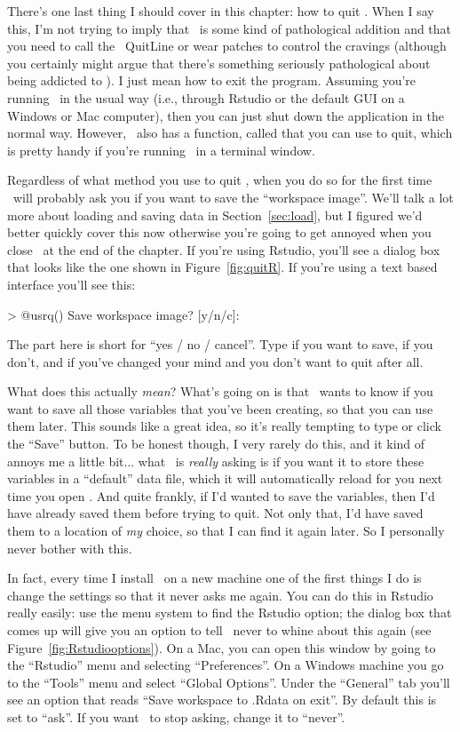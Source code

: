 There's one last thing I should cover in this chapter: how to quit \R. When I say this, I'm not trying to imply that \R\ is some kind of pathological addition and that you need to call the \R\ QuitLine or wear patches to control the cravings (although you certainly might argue that there's something seriously pathological about being addicted to \R). I just mean how to exit the program. Assuming you're running \R\ in the usual way (i.e., through Rstudio or the default GUI on a Windows or Mac computer), then you can just shut down the application in the normal way. However, \R\ also has a function, called  that you can use to quit, which is pretty handy if you're running \R\ in a terminal window.

Regardless of what method you use to quit \R, when you do so for the first time \R\ will probably ask you if you want to save the ``workspace image''. We'll talk a lot more about loading and saving data in Section~\ref{sec:load}, but I figured we'd better quickly cover this now otherwise you're going to get annoyed when you close \R\ at the end of the chapter. If you're using Rstudio, you'll see a dialog box that looks like the one shown in Figure~\ref{fig:quitR}. If you're using a text based interface you'll see this:
\begin{rblock1}
> @usr{q()}
Save workspace image? [y/n/c]: 
\end{rblock1}
The  part here is short for ``yes / no / cancel''. Type  if you want to save,  if you don't, and  if you've changed your mind and you don't want to quit after all. 

What does this actually {\it mean}? What's going on is that \R\ wants to know if you want to save all those variables that you've been creating, so that you can use them later. This sounds like a great idea, so it's really tempting to type  or click the ``Save'' button. To be honest though, I very rarely do this, and it kind of annoys me a little bit... what \R\ is {\it really} asking is if you want it to store these variables in a ``default'' data file, which it will automatically reload for you next time you open \R. And quite frankly, if I'd wanted to save the variables, then I'd have already saved them before trying to quit. Not only that, I'd have saved them to a location of {\it my} choice, so that I can find it again later. So I personally never bother with this. 

In fact, every time I install \R\ on a new machine one of the first things I do is change the settings so that it never asks me again. You can do this in Rstudio really easily: use the menu system to find the Rstudio option; the dialog box that comes up will give you an option to tell \R\ never to whine about this again (see Figure~\ref{fig:Rstudiooptions}). On a Mac, you can open this window by going to the ``Rstudio'' menu and selecting ``Preferences''. On a Windows machine you go to the ``Tools'' menu and select ``Global Options''. Under the ``General'' tab you'll see an option that reads ``Save workspace to .Rdata on exit''. By default this is set to ``ask''. If you want \R\ to stop asking, change it to ``never''.


